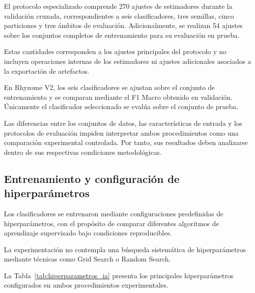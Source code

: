 \FloatBarrier

El protocolo especializado comprende 270 ajustes de estimadores durante la validación cruzada, correspondientes a seis clasificadores, tres semillas, cinco particiones y tres ámbitos de evaluación. Adicionalmente, se realizan 54 ajustes sobre los conjuntos completos de entrenamiento para su evaluación en prueba.

Estas cantidades corresponden a los ajustes principales del protocolo y no incluyen operaciones internas de los estimadores ni ajustes adicionales asociados a la exportación de artefactos.

En Rhyzome V2, los seis clasificadores se ajustan sobre el conjunto de entrenamiento y se comparan mediante el F1 Macro obtenido en validación. Únicamente el clasificador seleccionado se evalúa sobre el conjunto de prueba.

Las diferencias entre los conjuntos de datos, las características de entrada y los protocolos de evaluación impiden interpretar ambos procedimientos como una comparación experimental controlada. Por tanto, sus resultados deben analizarse dentro de sus respectivas condiciones metodológicas.


\subsection{Entrenamiento y configuración de hiperparámetros}
\label{subsec:configuracion_hiperparametros}
\label{subsec:reproducibilidad_entrenamiento}

Los clasificadores se entrenaron mediante configuraciones predefinidas de hiperparámetros, con el propósito de comparar diferentes algoritmos de aprendizaje supervisado bajo condiciones reproducibles.

La experimentación no contempla una búsqueda sistemática de hiperparámetros mediante técnicas como Grid Search o Random Search.

La Tabla~\ref{tab:hiperparametros_ia} presenta los principales hiperparámetros configurados en ambos procedimientos experimentales.

